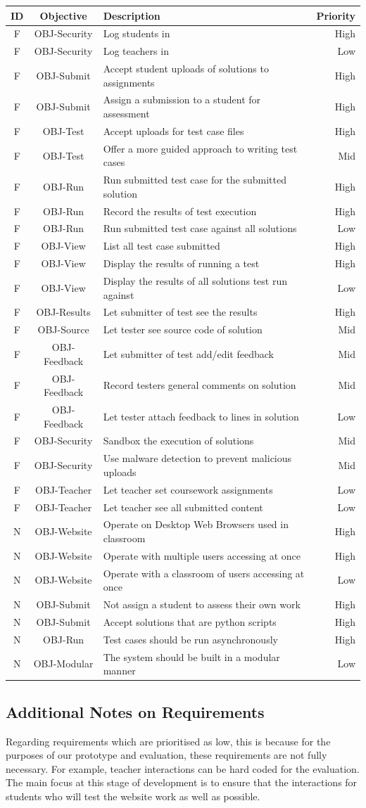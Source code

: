 \documentclass[a4paper,11pt]{report}
\newcounter{FunCount}
\newcounter{NFunCount}
\newcommand{\freq}[3]{\addtocounter{FunCount}{1}F\arabic{FunCount} & OBJ-#1 & #2 & #3\\}
\newcommand{\nfreq}[3]{\addtocounter{NFunCount}{1}N\arabic{NFunCount} & OBJ-#1 & #2 & #3\\}
\begin{document}
\begin{longtable}{cclr}
\textbf{ID} & \textbf{Objective} & \textbf{Description} & \textbf{Priority}\\\hline
\freq{Security}{Log students in}{High}
\freq{Security}{Log teachers in}{Low}
\freq{Submit}{Accept student uploads of solutions to assignments}{High}
\freq{Submit}{Assign a submission to a student for assessment}{High}
\freq{Test}{Accept uploads for test case files}{High}
\freq{Test}{Offer a more guided approach to writing test cases}{Mid}
\freq{Run}{Run submitted test case for the submitted solution}{High}
\freq{Run}{Record the results of test execution}{High}
\freq{Run}{Run submitted test case against all solutions}{Low}
\freq{View}{List all test case submitted}{High}
\freq{View}{Display the results of running a test}{High}
\freq{View}{Display the results of all solutions test run against}{Low}
\freq{Results}{Let submitter of test see the results}{High}
\freq{Source}{Let tester see source code of solution}{Mid}
\freq{Feedback}{Let submitter of test add/edit feedback}{Mid}
\freq{Feedback}{Record testers general comments on solution}{Mid}
\freq{Feedback}{Let tester attach feedback to lines in solution}{Low}
\freq{Security}{Sandbox the execution of solutions}{Mid}
\freq{Security}{Use malware detection to prevent malicious uploads}{Mid}
\freq{Teacher}{Let teacher set coursework assignments}{Low}
\freq{Teacher}{Let teacher see all submitted content}{Low}
\nfreq{Website}{Operate on Desktop Web Browsers used in classroom}{High}
\nfreq{Website}{Operate with multiple users accessing at once}{High}
\nfreq{Website}{Operate with a classroom of users accessing at once}{Low}
\nfreq{Submit}{Not assign a student to assess their own work}{High}
\nfreq{Submit}{Accept solutions that are python scripts}{High}
\nfreq{Run}{Test cases should be run asynchronously}{High}
\nfreq{Modular}{The system should be built in a modular manner}{Low}
\end{longtable}

\subsection{Additional Notes on Requirements}
Regarding requirements which are prioritised as low, this is because for the purposes of our prototype and evaluation, these requirements are not fully necessary. For example, teacher interactions can be hard coded for the evaluation. The main focus at this stage of development is to ensure that the interactions for students who will test the website work as well as possible.
\end{document}
